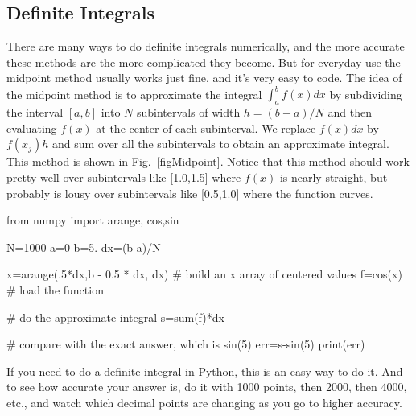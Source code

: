 \subsection*{Definite Integrals}
 There are many ways to do definite integrals
numerically, and the more accurate these methods are the more complicated
they become. But for everyday use the midpoint method usually works just
fine, and it's very easy to code. The idea of the midpoint method is to
approximate the integral $\int_a^b f(x) dx$ by subdividing the interval
$[a,b]$ into $N$ subintervals of width $h = (b-a)/N$ and then evaluating
$f(x)$ at the center of each subinterval. We replace $f(x) dx$ by $f(x_j) h$
and sum over all the subintervals to obtain an approximate integral. This
method is shown in Fig.~\ref{figMidpoint}. Notice that this method should
work pretty well over subintervals like [1.0,1.5] where $f(x)$ is nearly
straight, but probably is lousy over subintervals like [0.5,1.0] where the
function curves.




\begin{codeexample}
\begin{VerbatimOut}{\listingFile}
from numpy import arange, cos,sin

N=1000
a=0
b=5.
dx=(b-a)/N

x=arange(.5*dx,b - 0.5 * dx, dx)  # build an x array of centered values
f=cos(x)  # load the function

# do the approximate integral
s=sum(f)*dx

# compare with the exact answer, which is sin(5)
err=s-sin(5)
print(err)
\end{VerbatimOut}
\end{codeexample}

If you need to do a definite integral in Python, this is an easy way to do
it. And to see how accurate your answer is, do it with 1000 points, then
2000, then 4000, etc., and watch which decimal points are changing as you go
to higher accuracy.

